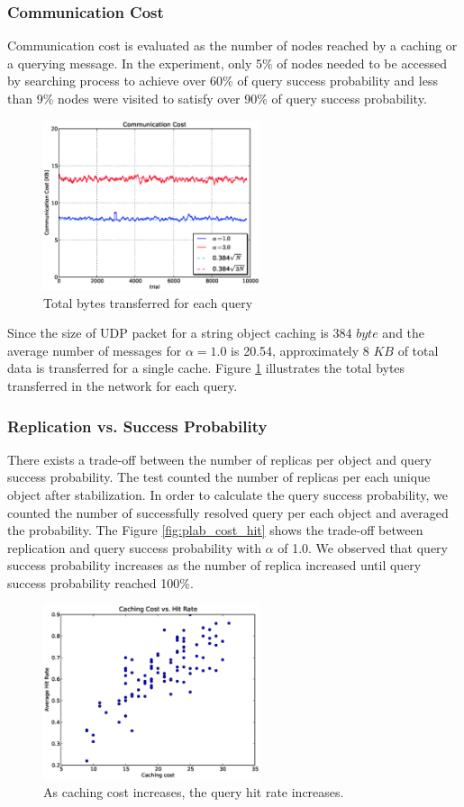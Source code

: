 \documentclass[9.5pt,journal,final,finalsubmission,twocolumn]{IEEEtran}
\begin{document}
\subsubsection{Communication Cost}
Communication cost is evaluated as the number of nodes reached by 
a caching or a querying message. 
In the experiment, only 5\% of nodes needed to be accessed by 
searching process to 
achieve over 60\% of query success probability and less than 9\%
nodes were visited to satisfy over 90\% of query success probability.
\begin{figure}
\centering
\includegraphics[width=2.5in]{plab_cost_kb}
\caption{Total bytes transferred for each query}
\label{fig:plab_cost}
\end{figure}
Since the size of UDP packet for a string object caching is 384 $byte$
and the average number of messages for $\alpha=1.0$ is 20.54, 
approximately 8 $KB$ of total data is transferred for a single cache.
Figure \ref{fig:plab_cost} illustrates the total bytes transferred
in the network for each query. 


\subsubsection{Replication vs. Success Probability}
There exists a trade-off between the number of replicas per object and query success
probability.
The test counted the number of replicas per each unique object after 
stabilization. In order to calculate the query success probability, we counted 
the number of successfully resolved query per each object and averaged the probability.
The Figure \ref{fig:plab_cost_hit} shows the trade-off
between replication and query success probability with $\alpha$ of 1.0. 
We observed that query success probability increases as the number 
of replica increased until query success probability reached 100\%.

\begin{figure}[ht]
\centering
\includegraphics[width=2.5in]{c_cost_vs_hit1.eps}
\caption{As caching cost increases, the query hit rate increases.} \label{fig:latency}
\end{figure}
\end{document}
